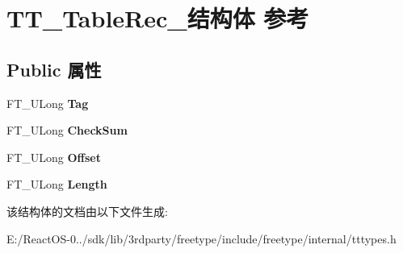 \hypertarget{struct_t_t___table_rec__}{}\section{T\+T\+\_\+\+Table\+Rec\+\_\+结构体 参考}
\label{struct_t_t___table_rec__}
\subsection*{Public 属性}
\begin{DoxyCompactItemize}
\item 
\mbox{\label{struct_t_t___table_rec___aaccaf9e9d3421fc37fa6e51875534995}} 
F\+T\+\_\+\+U\+Long {\bfseries Tag}
\item 
\mbox{\label{struct_t_t___table_rec___aacf9207fae3522bb65359c2288900fca}} 
F\+T\+\_\+\+U\+Long {\bfseries Check\+Sum}
\item 
\mbox{\label{struct_t_t___table_rec___a91840e1cee040f8da6a34a081dda17b6}} 
F\+T\+\_\+\+U\+Long {\bfseries Offset}
\item 
\mbox{\label{struct_t_t___table_rec___aa0d3a1f4491bf4418bc26241bdd7d21b}} 
F\+T\+\_\+\+U\+Long {\bfseries Length}
\end{DoxyCompactItemize}


该结构体的文档由以下文件生成\+:\begin{DoxyCompactItemize}
\item 
E\+:/\+React\+O\+S-\/0../sdk/lib/3rdparty/freetype/include/freetype/internal/tttypes.\+h\end{DoxyCompactItemize}
